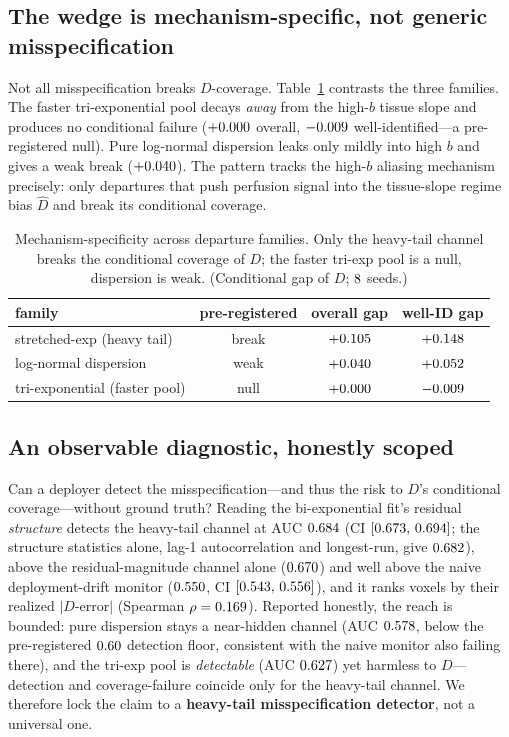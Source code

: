 \documentclass[11pt]{article}
\begin{document}
\subsection{The wedge is mechanism-specific, not generic misspecification}\label{sec:scope}
Not all misspecification breaks $D$-coverage. Table~\ref{tab:families} contrasts
the three families. The faster tri-exponential pool decays \emph{away} from the
high-$b$ tissue slope and produces no conditional failure ($+0.000$ overall,
$-0.009$ well-identified---a pre-registered null). Pure log-normal dispersion
leaks only mildly into high $b$ and gives a weak break ($+0.040$). The pattern
tracks the high-$b$ aliasing mechanism precisely: only departures that push
perfusion signal into the tissue-slope regime bias $\hat D$ and break its
conditional coverage.

\begin{table}[t]
\centering
\caption{Mechanism-specificity across departure families. Only the heavy-tail
channel breaks the conditional coverage of $D$; the faster tri-exp pool is a null,
dispersion is weak. (Conditional gap of $D$; $8$ seeds.)}
\label{tab:families}
\begin{tabular}{lccc}
\toprule
family & pre-registered & overall gap & well-ID gap \\
\midrule
stretched-exp (heavy tail) & break & $+0.105$ & $+0.148$ \\
log-normal dispersion      & weak  & $+0.040$ & $+0.052$ \\
tri-exponential (faster pool) & null & $+0.000$ & $-0.009$ \\
\bottomrule
\end{tabular}
\end{table}

\subsection{An observable diagnostic, honestly scoped}\label{sec:diag}
Can a deployer detect the misspecification---and thus the risk to $D$'s conditional
coverage---without ground truth? Reading the bi-exponential fit's residual
\emph{structure} detects the heavy-tail channel at AUC $0.684$ (CI
$[0.673,\,0.694]$; the structure statistics alone, lag-1 autocorrelation
and longest-run, give $0.682$), above the residual-magnitude channel alone
($0.670$) and well above the naive deployment-drift monitor ($0.550$,
CI $[0.543,\,0.556]$), and it ranks voxels by their realized
$|D$-error$|$ (Spearman $\rho=0.169$). Reported honestly, the reach is bounded:
pure dispersion stays a near-hidden channel (AUC $0.578$, below the
pre-registered $0.60$ detection floor, consistent with the naive monitor
also failing there), and the tri-exp pool is \emph{detectable} (AUC $0.627$)
yet harmless to $D$---detection and coverage-failure coincide only for the
heavy-tail channel. We therefore lock the claim to a \textbf{heavy-tail
misspecification detector}, not a universal one.
\end{document}
